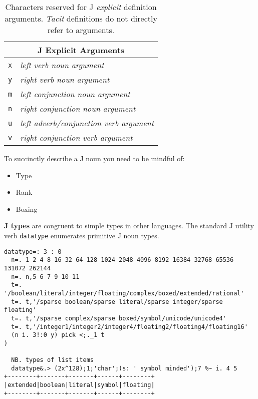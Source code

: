 \begin{table}[htbp]
  \centering
   \scriptsize
\begin{tabular}{|l|l|} \hline
   \multicolumn{2}{|c|}{\textbf{\normalsize J Explicit Arguments\T\B}} \\ \hline
   \texttt{x\T\B} & \textcolor{CodeComment}{\ttfamily\textsl{left verb noun argument}}  \\
   \texttt{y\T\B} & \textcolor{CodeComment}{\ttfamily\textsl{right verb noun argument}} \\ 
   \texttt{m\T\B} & \textcolor{CodeComment}{\ttfamily\textsl{left conjunction noun argument}} \\ 
   \texttt{n\T\B} & \textcolor{CodeComment}{\ttfamily\textsl{right conjunction noun argument}} \\ 
   \texttt{u\T\B} & \textcolor{CodeComment}{\ttfamily\textsl{left adverb/conjunction verb argument}} \\ 
   \texttt{v\T\B} & \textcolor{CodeComment}{\ttfamily\textsl{right conjunction verb argument}}  \\ \hline
\end{tabular}
   \caption[J Arguments]{Characters reserved for J \emph{explicit} definition arguments. \emph{Tacit} definitions do
   not directly refer to arguments.}
   \label{tab:jargs}
\end{table}

To succinctly describe a J noun you need to be mindful of:
\begin{itemize}
	\item Type
	\item Rank
	\item Boxing
\end{itemize}

\textbf{J types} are congruent to simple types in other languages.  The standard J utility verb \texttt{datatype} enumerates primitive J noun types.

\begin{lstlisting}[frame=single,framerule=0pt,basicstyle=\ttfamily\footnotesize] 
datatype=: 3 : 0
  n=. 1 2 4 8 16 32 64 128 1024 2048 4096 8192 16384 32768 65536 131072 262144
  n=. n,5 6 7 9 10 11
  t=. '/boolean/literal/integer/floating/complex/boxed/extended/rational'
  t=. t,'/sparse boolean/sparse literal/sparse integer/sparse floating'
  t=. t,'/sparse complex/sparse boxed/symbol/unicode/unicode4'
  t=. t,'/integer1/integer2/integer4/floating2/floating4/floating16'
  (n i. 3!:0 y) pick <;._1 t
)

  NB. types of list items
  datatype&.> (2x^128);1;'char';(s: ' symbol minded');7 %~ i. 4 5
+--------+-------+-------+------+--------+
|extended|boolean|literal|symbol|floating|
+--------+-------+-------+------+--------+
\end{lstlisting}  

